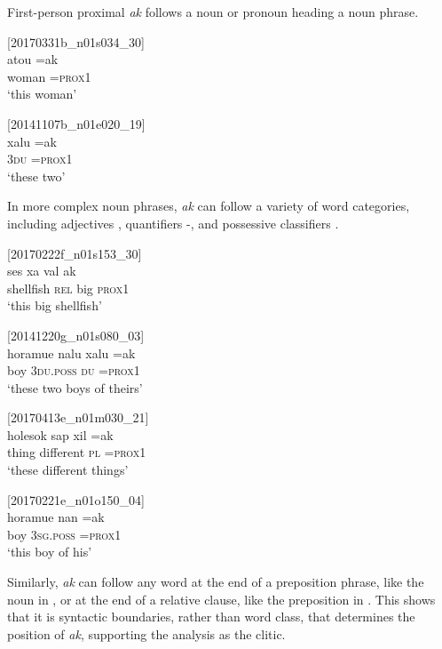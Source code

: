 \documentclass[output=paper,colorlinks,citecolor=brown]{langscibook}
\begin{document}
First-person proximal \textit{ak} follows a noun  or pronoun  heading a noun phrase.

\ea
{\label{ex:ridge:5}[20170331b\_n01s034\_30]}\\
\gll atou  =ak \\
     woman  \textsc{=prox1}\\
\glt ‘this woman’
\z

\ea
{\label{ex:ridge:6}[20141107b\_n01e020\_19]}\\
\gll xalu  =ak\\
     \textsc{3du}  \textsc{=prox1}\\
\glt ‘these two’
\z

In more complex noun phrases, \textit{ak} can follow a variety of word categories, including adjectives , quantifiers -, and possessive classifiers .

\ea
{\label{ex:ridge:7}[20170222f\_n01s153\_30]}\\
\gll {\ob}ses  {\ob}xa  val{\cb}{\cb}  ak{\cb}\\
     {\db}shellfish  {\db}\textsc{rel}  big  \textsc{prox1}\\
\glt ‘this big shellfish’
\z

\ea
{\label{ex:ridge:8}[20141220g\_n01s080\_03]}\\
\gll {\ob}{\ob}horamue  nalu{\cb}    xalu{\cb}  =ak\\
     {\db}{\db}boy    \textsc{3du.poss} \textsc{du} \textsc{=prox1}\\
\glt ‘these two boys of theirs’
\z

\ea
{\label{ex:ridge:9}[20170413e\_n01m030\_21]}\\
\gll {\ob}{\ob}holesok   sap{\cb}     xil{\cb}   =ak\\
     {\db}{\db}thing    different  \textsc{pl}  \textsc{=prox1}\\
\glt ‘these different things’
\z

\ea
{\label{ex:ridge:10}[20170221e\_n01o150\_04]}\\
\gll {\ob}horamue  nan{\cb}    =ak\\
     {\db}boy    \textsc{3sg.poss}  \textsc{=prox1}\\
\glt ‘this boy of his’
\z

Similarly, \textit{ak} can follow any word at the end of a preposition phrase, like the noun in , or at the end of a relative clause, like the preposition in . This shows that it is syntactic boundaries, rather than word class, that determines the position of \textit{ak}, supporting the analysis as the clitic.
\end{document}
